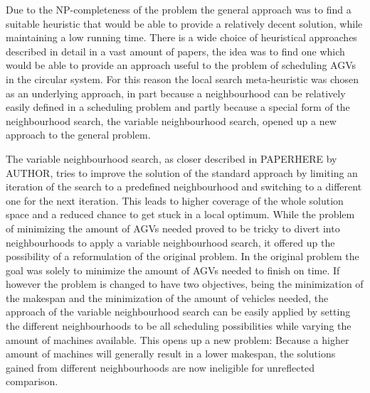Due to the NP-completeness of the problem the general approach was to find a suitable heuristic that would be able to provide a relatively decent
solution, while maintaining a low running time. There is a wide choice of heuristical approaches described in detail in a vast amount of papers,
the idea was to find one which would be able to provide an approach useful to the problem of scheduling AGVs in the circular system. For this reason
the local search meta-heuristic was chosen as an underlying approach, in part because a neighbourhood can be relatively easily defined in a scheduling
problem and partly because a special form of the neighbourhood search, the variable neighbourhood search, opened up a new approach to the general
problem. 

The variable neighbourhood search, as closer described in PAPERHERE by AUTHOR, tries to improve the solution of the standard approach by limiting
an iteration of the search to a predefined neighbourhood and switching to a different one for the next iteration. This leads to higher coverage of
the whole solution space and a reduced chance to get stuck in a local optimum. While the problem of minimizing the amount of AGVs needed proved
to be tricky to divert into neighbourhoods to apply a variable neighbourhood search, it offered up the possibility of a reformulation of the original
problem. In the original problem the goal was solely to minimize the amount of AGVs needed to finish on time. If however the problem is changed to
have two objectives, being the minimization of the makespan and the minimization of the amount of vehicles needed, the approach of the variable
neighbourhood search can be easily applied by setting the different neighbourhoods to be all scheduling possibilities while varying the amount of
machines available. This opens up a new problem: Because a higher amount of machines will generally result in a lower makespan, the solutions gained
from different neighbourhoods are now ineligible for unreflected comparison.

